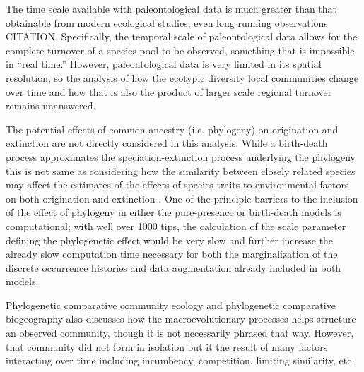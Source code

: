 \documentclass[12pt,letterpaper]{article}
\begin{document}
The time scale available with paleontological data is much greater than that obtainable from modern ecological studies, even long running observations CITATION. Specifically, the temporal scale of paleontological data allows for the complete turnover of a species pool to be observed, something that is impossible in ``real time.'' However, paleontological data is very limited in its spatial resolution, so the analysis of how the ecotypic diversity local communities change over time and how that is also the product of larger scale regional turnover remains unanswered.

The potential effects of common ancestry (i.e. phylogeny) on origination and extinction are not directly considered in this analysis. While a birth-death process approximates the speciation-extinction process underlying the phylogeny \citep{Silvestro2014a} this is not same as considering how the similarity between closely related species may affect the estimates of the effects of species traits to environmental factors on both origination and extinction \citep{Smits2015b,Harnik2014}. One of the principle barriers to the inclusion of the effect of phylogeny in either the pure-presence or birth-death models is computational; with well over 1000 tips, the calculation of the scale parameter defining the phylogenetic effect would be very slow and further increase the already slow computation time necessary for both the marginalization of the discrete occurrence histories and data augmentation already included in both models.

Phylogenetic comparative community ecology and phylogenetic comparative biogeography also discusses how the macroevolutionary processes helps structure an observed community, though it is not necessarily phrased that way. However, that community did not form in isolation but it the result of many factors interacting over time including incumbency, competition, limiting similarity, etc.
\end{document}
